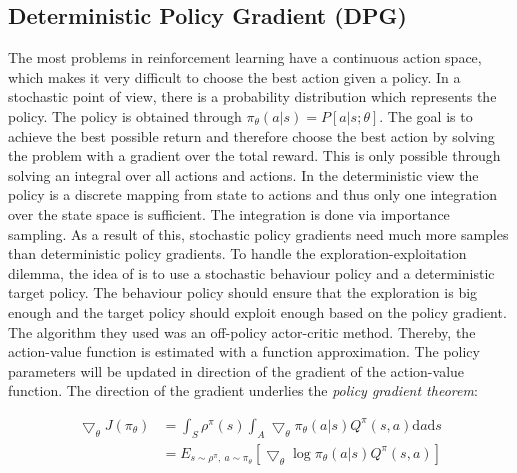 \subsection{Deterministic Policy Gradient (DPG)}
\label{sec:DPG}
\nocite{lillicrap2015continuous}
The most problems in reinforcement learning have a continuous action space, 
which makes it very difficult to choose the best action given a policy. In a 
stochastic point of view, there is a probability distribution which represents 
the policy. The policy is obtained through $\pi_\theta(a|s) =P[a|s;\theta]$. 
The goal is to achieve the best possible return and therefore choose the best 
action by solving the problem with a gradient over the total reward. This is 
only possible through solving an integral over all actions and actions. In the 
deterministic view the policy is a discrete mapping from state to actions and 
thus only one integration over the state space is sufficient. The integration 
is done via importance sampling. As a result of 
this, stochastic policy gradients need much more samples than deterministic 
policy gradients. To handle the exploration-exploitation dilemma, the idea of 
\citeauthor{silver2014deterministic} is to use a stochastic behaviour policy  
and a deterministic target policy. The behaviour policy should ensure that the 
exploration is big enough and the target policy should exploit enough based on 
the policy gradient. The algorithm they used was an off-policy actor-critic 
method. Thereby, the action-value function is estimated with a function 
approximation. The policy parameters will be updated in direction of the 
gradient of the action-value function. The direction of the gradient underlies 
the \textit{policy gradient theorem}: 

\begin{align*}
\bigtriangledown_\theta 
J(\pi_\theta)&=\int_{S}^{}\rho^\pi(s)\int_{A}\bigtriangledown_\theta 
\pi_\theta(a|s)Q^\pi(s,a)\mathrm{d}a\mathrm{d}s\\
&=E_{s \sim \rho^\pi,\: a\sim\pi_\theta}[\bigtriangledown_\theta \log 
\pi_\theta (a|s)Q^\pi(s,a)]
\end{align*}%

